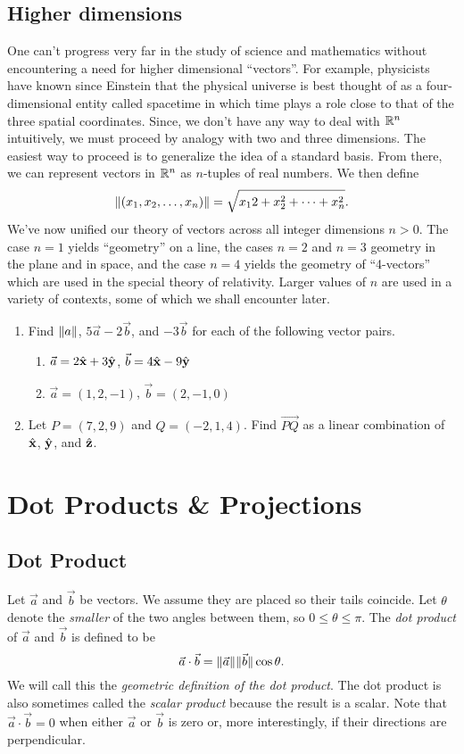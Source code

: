 \subsection{Higher dimensions}
One can't progress very far in the study of science and mathematics
without encountering a need for higher dimensional ``vectors''.  For
example, physicists have known since Einstein that the physical
universe is best thought of as a four-dimensional entity called
spacetime in which time plays a role close to that of the 
three spatial coordinates.  Since, we don't have any way to deal with
$\mathbb{R}^n$
intuitively, we must
proceed by analogy with two and three dimensions.
The easiest
way to proceed is to generalize the idea of a standard basis.
From there, we can represent vectors in $\mathbb{R}^n$ as $n$-tuples of real numbers.
We then define
\[
	\lVert(x_1,x_2,\ldots,x_n)\rVert = \sqrt{x_12+x_2^2+\cdots+x_n^2}.	
\]
We've now unified our theory of vectors across all integer dimensions $n>0$.
The case $n=1$ yields  ``geometry'' on a line, 
the cases $n = 2$ and $n = 3$ geometry in the plane and in space, and
the case $n = 4$ yields the geometry of ``4-vectors'' which
are  used in the special theory of relativity.
Larger values of $n$ are used in a
variety of contexts, some of which we shall encounter later.


\begin{exercises}
	\begin{enumerate}
		\item Find $\lVert a\rVert$, $5\vec a-2\vec b$, and $-3\vec b$ for each of
			the following vector pairs.
			\begin{enumerate}
				\item $\vec a=2{\hat {\mathbf x}}+3{\hat {\mathbf y}}$, $\vec b=4{\hat {\mathbf x}}-9{\hat {\mathbf y}}$
				\item $\vec a=(1,2,-1)$, $\vec b=(2,-1,0)$
			\end{enumerate}
		\item Let $P=(7,2,9)$ and $Q=(-2,1,4)$.  Find $\overrightarrow{PQ}$
			as a linear combination of ${\hat {\mathbf x}}$, ${\hat {\mathbf y}}$, and ${\hat {\mathbf z}}$.
	\end{enumerate}
\end{exercises}


\section{Dot Products \& Projections}
\subsection{Dot Product}
Let $\vec a$ and $\vec b$ be vectors.  We assume they are placed so their
tails coincide.  Let $\theta$ denote the \emph{smaller} of the
two angles between them, so $0\le \theta \le \pi$.
The \emph{dot product} of $\vec a$ and $\vec b$ is defined to be
\[
	\vec a\cdot \vec b=\lVert\vec a\rVert\lVert\vec b\rVert\cos \theta.
\]
We will call this the \emph{geometric definition of the dot product}.
The dot product is also sometimes called the \emph{scalar product} because
the result is a scalar.
Note that $\vec a\cdot\vec b = 0$ when either $\vec a$ or $\vec b$ is zero or,
more interestingly, if their directions are perpendicular.

